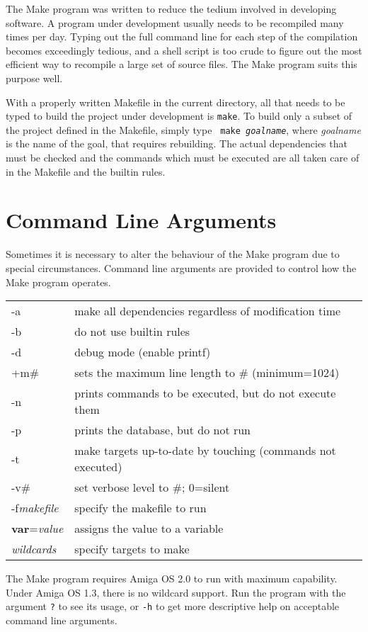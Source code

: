 The Make program was written to reduce the tedium involved in developing
software.  A program under development usually needs to be recompiled
many times per day.  Typing out the full command line for each step of the
compilation becomes exceedingly tedious, and a shell script is too crude to
figure out the most efficient way to recompile a large set of source files.
The Make program suits this purpose well.

With a properly written Makefile in the current directory, all that needs
to be typed to build the project under development is {\tt make}.  To build
only a subset of the project defined in the Makefile, simply type {\tt
make~\it goalname}, where {\it goalname} is the name of the goal, that
requires rebuilding.  The actual dependencies that must be checked and the
commands which must be executed are all taken care of in the Makefile and
the builtin rules.

\section{Command Line Arguments}

Sometimes it is necessary to alter the behaviour of the Make program due to
special circumstances.  Command line arguments are provided to control how
the Make program operates.

\begin{tabular}{ll}
{-a}	& make all dependencies regardless of modification time \\
{-b}	& do not use builtin rules \\
{-d}	& debug mode (enable printf) \\
{+m\#}	& sets the maximum line length to \# (minimum=1024) \\
{-n}	& prints commands to be executed, but do not execute them \\
{-p}	& prints the database, but do not run \\
{-t}	& make targets up-to-date by touching (commands not executed) \\
{-v\#}	& set verbose level to \#; 0=silent \\
{-f{\em makefile}}	& specify the makefile to run \\
{{\bf var}={\em value}}	& assigns the value to a variable \\
{{\em wildcards}}	& specify targets to make
\end{tabular}

The Make program requires Amiga OS 2.0 to run with maximum capability.
Under Amiga OS 1.3, there is no wildcard support.  Run the program with the
argument {\tt ?} to see its usage, or {\tt -h} to get more descriptive help
on acceptable command line arguments.

